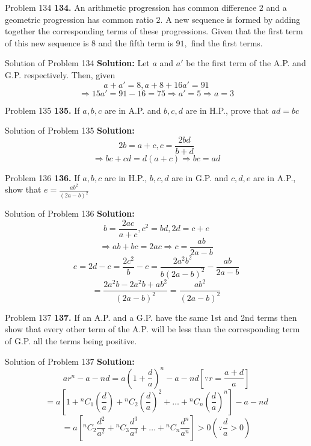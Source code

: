 \documentclass[aspectratio=1610,8pt]{beamer}
\begin{document}
\begin{frame}{Problem 134}
  \textbf{134.} An arithmetic progression has common difference $2$ and a geometric progression has common ratio $2.$ A new
  sequence is formed by adding together the corresponding terms of these progressions. Given that the first term of this new
  sequence is $8$ and the fifth term is $91,$ find the first terms.
\end{frame}
\begin{frame}{Solution of Problem 134}
  \textbf{Solution:} Let $a$ and $a'$ be the first term of the A.P. and G.P. respectively. Then, given
  $$a + a' = 8, a + 8 + 16a' = 91$$
  $$\Rightarrow 15a' = 91 -16 = 75 \Rightarrow a' = 5 \Rightarrow a = 3$$
\end{frame}
\begin{frame}{Problem 135}
  \textbf{135.} If $a, b, c$ are in A.P. and $b, c, d$ are in H.P., prove that $ad = bc$
\end{frame}
\begin{frame}{Solution of Problem 135}
  \textbf{Solution:} $$2b = a + c, c = \frac{2bd}{b + d}$$
  $$\Rightarrow bc + cd = d(a + c)\Rightarrow bc = ad$$
\end{frame}
\begin{frame}{Problem 136}
  \textbf{136.} If $a, b, c$ are in H.P., $b, c, d$ are in G.P. and $c, d, e$ are in A.P., show that $e = \frac{ab^2}{(2a - b)^2}$
\end{frame}
\begin{frame}{Solution of Problem 136}
  \textbf{Solution:} $$b = \frac{2ac}{a + c}, c^2 = bd, 2d = c + e$$
  $$\Rightarrow ab + bc = 2ac \Rightarrow c = \frac{ab}{2a - b}$$
  $$e = 2d - c = \frac{2c^2}{b} - c = \frac{2a^2b^2}{b(2a - b)^2} - \frac{ab}{2a - b}$$
  $$= \frac{2a^2b - 2a^2b + ab^2}{(2a - b)^2} = \frac{ab^2}{(2a - b)^2}$$
\end{frame}
\begin{frame}{Problem 137}
  \textbf{137.} If an A.P. and a G.P. have the same 1st and 2nd terms then show that every other term of the A.P. will be less than
  the corresponding term of G.P. all the terms being positive.
\end{frame}
\begin{frame}{Solution of Problem 137}
  \textbf{Solution:} $$ar^n - a - nd = a\left(1 + \frac{d}{a}\right)^n - a - nd\left[\because r = \frac{a + d}{a}\right]$$
  $$= a\left[1 + {}^nC_1\left(\frac{d}{a}\right) + {}^nC_2\left(\frac{d}{a}\right)^2 + \ldots +
    {}^nC_n\left(\frac{d}{a}\right)^n\right] - a - nd$$
  $$= a\left[{}^nC_2\frac{d^2}{a^2} + {}^nC_3\frac{d^3}{a^3} + \ldots + {}^nC_n\frac{d^n}{a^n}\right] > 0 \left(\because
  \frac{d}{a}> 0\right)$$
\end{frame}
\end{document}
